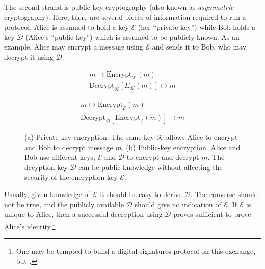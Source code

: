 
The second strand is public-key cryptography (also known as \emph{asymmetric} cryptography). Here, there are several pieces of information required to run a protocol. Alice is assumed to hold a key $\mathcal{E}$ (her ``private key'') while Bob holds a key $\mathcal{D}$ (Alice's ``public-key'') which is assumed to be publicly known. As an example, Alice may encrypt a message using $\mathcal{E}$ and sends it to Bob, who may decrypt it using $\mathcal{D}$.  

\begin{figure}[htp]
\centering
\captionsetup{width=0.8\linewidth}
\begin{framed}
\begin{subfigure}{0.4\textwidth}
\begin{align*}
m \mapsto \text{Encrypt}_\mathcal{K}\left(m\right) \\
\text{Decrypt}_\mathcal{K}\left[E_\mathcal{K}\left(m\right)\right] \mapsto m
\end{align*}
\caption{}
\end{subfigure}
\begin{subfigure}{0.4\textwidth}
\begin{align*}
m \mapsto \text{Encrypt}_\mathcal{E}\left(m\right) \\
\text{Decrypt}_\mathcal{D}\left[\text{Encrypt}_\mathcal{E}\left(m\right)\right] \mapsto m
\end{align*}
\caption{}
\end{subfigure}
\caption{(a) Private-key encryption. The same key $\mathcal{K}$ allows Alice to encrypt and Bob to decrypt message $m$. (b) Public-key encryption. Alice and Bob use different keys, $\mathcal{E}$ and $\mathcal{D}$ to encrypt and decrypt $m$. The decyption key $\mathcal{D}$ can be public knowledge without affecting the security of the encryption key $\mathcal{E}$.}
\label{fig:pubpriv}
\end{framed}
\end{figure}

Usually, given knowledge of $\mathcal{E}$ it should be easy to derive $\mathcal{D}$. The converse should not be true, and the publicly available $\mathcal{D}$ should give no indication of $\mathcal{E}$. If $\mathcal{E}$ is unique to Alice, then a successful decryption using $\mathcal{D}$ proves sufficient to prove Alice's identity.\footnote{One may be tempted to build a digital signatures protocol on this exchange, but .}

